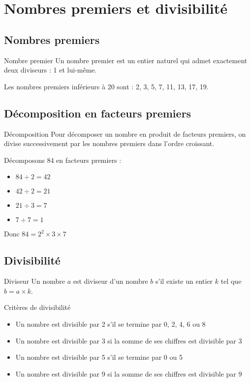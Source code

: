 \chapter{Nombres premiers et divisibilité}

\section{Nombres premiers}
\begin{definition}{Nombre premier}
Un nombre premier est un entier naturel qui admet exactement deux diviseurs : 1 et lui-même.
\end{definition}

\begin{exemple}
Les nombres premiers inférieurs à 20 sont : 2, 3, 5, 7, 11, 13, 17, 19.
\end{exemple}

\section{Décomposition en facteurs premiers}
\begin{methode}{Décomposition}
Pour décomposer un nombre en produit de facteurs premiers, on divise successivement par les nombres premiers dans l'ordre croissant.
\end{methode}

\begin{exemple}
Décomposons 84 en facteurs premiers :
\begin{itemize}
    \item $84 \div 2 = 42$
    \item $42 \div 2 = 21$
    \item $21 \div 3 = 7$
    \item $7 \div 7 = 1$
\end{itemize}
Donc $84 = 2^2 \times 3 \times 7$
\end{exemple}

\section{Divisibilité}
\begin{definition}{Diviseur}
Un nombre $a$ est diviseur d'un nombre $b$ s'il existe un entier $k$ tel que $b = a \times k$.
\end{definition}

\begin{propriete}{Critères de divisibilité}
\begin{itemize}
    \item Un nombre est divisible par 2 s'il se termine par 0, 2, 4, 6 ou 8
    \item Un nombre est divisible par 3 si la somme de ses chiffres est divisible par 3
    \item Un nombre est divisible par 5 s'il se termine par 0 ou 5
    \item Un nombre est divisible par 9 si la somme de ses chiffres est divisible par 9
\end{itemize}
\end{propriete} 